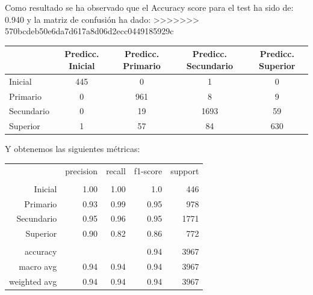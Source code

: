 \documentclass[a4paper]{article}
\begin{document}
            Como resultado se ha observado que el Accuracy score para el test ha sido de: 0.940 y la matriz de confusión ha dado:
>>>>>>> 570bcdeb50e6da7d617a8d06d2ecc0449185929c
            \begin{table}[H]
                \centering
                \begin{tabular}{|l|c|c|c|c|}
                \hline
                    ~ & Predicc. Inicial & Predicc. Primario & Predicc. Secundario & Predicc. Superior \\ \hline
                    Inicial & 445 & 0 & 1 & 0 \\ \hline
                    Primario & 0 & 961 & 8 & 9 \\ \hline
                    Secundario & 0 & 19 & 1693 & 59 \\ \hline
                    Superior & 1 & 57 & 84 & 630 \\ \hline
                \end{tabular}
            \end{table}

            Y obtenemos las siguientes métricas:

            \begin{table}[H]
                \centering
                \begin{tabular}{rrrrr}
                    ~ & precision & recall & f1-score & support \\ 
                    & & & & \\
                    Inicial    & 1.00& 1.00 & 1.0 & 446 \\ 
                    Primario   & 0.93 & 0.99 & 0.95 & 978 \\ 
                    Secundario & 0.95 & 0.96 & 0.95 & 1771 \\ 
                    Superior   & 0.90 & 0.82 & 0.86 & 772 \\ 
                    & & & & \\
                    accuracy & & & 0.94 & 3967 \\ 
                    macro avg & 0.94 & 0.94 & 0.94 & 3967 \\ 
                    weighted avg & 0.94 & 0.94 & 0.94 & 3967 \\ 
                \end{tabular}
            \end{table}
\end{document}
